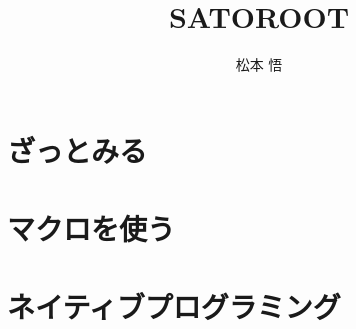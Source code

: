 \documentclass[openany]{report}
\begin{document}
\title{ \fontsize{60pt}{40pt}\selectfont SATOROOT}
\author{松本 悟}
\maketitle

\pagestyle{fancy}
\fancyhead{}
\fancyhead[RO,RE]{\rightmark}
\fancyhead[LE,LO]{\leftmark}
\cfoot{\thepage} 

\renewcommand{\sectionmark}[1]{\markright{\thesection \ \ #1}{}}

\newcommand{\ROOT}{\texttt{ROOT}}
\newcommand{\Cpp}{\texttt{C++}}





\tableofcontents


\setcounter{page}{1}

\chapter{ざっとみる}


\chapter{マクロを使う}













\chapter{ネイティブプログラミング}







\clearpage
\appendix




\end{document}
